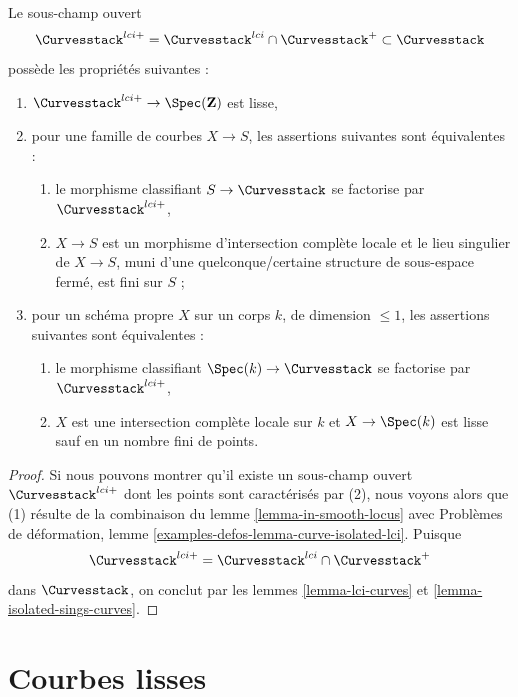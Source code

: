 \begin{lemma}
\label{lemma-big-smooth-part-curves}
Le sous-champ ouvert
$$
\Curvesstack^{lci+} =
\Curvesstack^{lci} \cap \Curvesstack^{+}
\subset \Curvesstack
$$
possède les propriétés suivantes :
\begin{enumerate}
\item $\Curvesstack^{lci+} \to \Spec(\mathbf{Z})$ est lisse,
\item pour une famille de courbes $X \to S$, les assertions suivantes sont équivalentes :
\begin{enumerate}
\item le morphisme classifiant $S \to \Curvesstack$ se factorise par
$\Curvesstack^{lci+}$,
\item $X \to S$ est un morphisme d'intersection complète locale et
le lieu singulier de $X \to S$, muni d'une quelconque/certaine structure
de sous-espace fermé, est fini sur $S$ ;
\end{enumerate}
\item pour un schéma propre $X$ sur un corps $k$, de dimension $\leq 1$,
les assertions suivantes sont équivalentes :
\begin{enumerate}
\item le morphisme classifiant $\Spec(k) \to \Curvesstack$ se factorise
par $\Curvesstack^{lci+}$,
\item $X$ est une intersection complète locale sur $k$ et
$X \to \Spec(k)$ est lisse sauf en un nombre fini de points.
\end{enumerate}
\end{enumerate}
\end{lemma}

\begin{proof}
Si nous pouvons montrer qu'il existe un sous-champ ouvert $\Curvesstack^{lci+}$
dont les points sont caractérisés par (2), nous voyons alors que
(1) résulte de la combinaison du lemme \ref{lemma-in-smooth-locus} avec
Problèmes de déformation, lemme \ref{examples-defos-lemma-curve-isolated-lci}.
Puisque
$$
\Curvesstack^{lci+} = \Curvesstack^{lci} \cap \Curvesstack^{+}
$$
dans $\Curvesstack$, on conclut par les
lemmes \ref{lemma-lci-curves} et \ref{lemma-isolated-sings-curves}.
\end{proof}




\section{Courbes lisses}
\label{section-smooth-curves}

